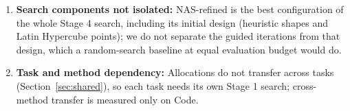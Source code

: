 \documentclass[11pt]{article}
\begin{document}
\begin{enumerate}
\item \textbf{Search components not isolated:} NAS-refined is the best configuration of the whole Stage 4 search, including its initial design (heuristic shapes and Latin Hypercube points); we do not separate the guided iterations from that design, which a random-search baseline at equal evaluation budget would do.
\item \textbf{Task and method dependency:} Allocations do not transfer across tasks (Section~\ref{sec:shared}), so each task needs its own Stage 1 search; cross-method transfer is measured only on Code.
\end{enumerate}

\FloatBarrier




\end{document}
